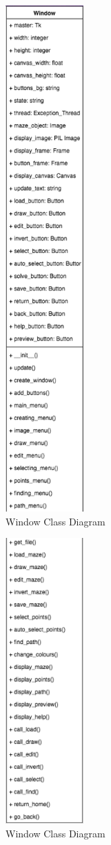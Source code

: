 \documentclass[titlepage]{article}
\begin{document}
\begin{figure}[H]
  \centering
  \includegraphics[width=3cm]{window1.png}
  \caption{Window Class Diagram}
  \label{fig:dijk}
\end{figure}

\begin{figure}[H]
  \centering
  \includegraphics[width=3cm]{window2.png}
  \caption{Window Class Diagram}
  \label{fig:dijk}
\end{figure}
\end{document}
